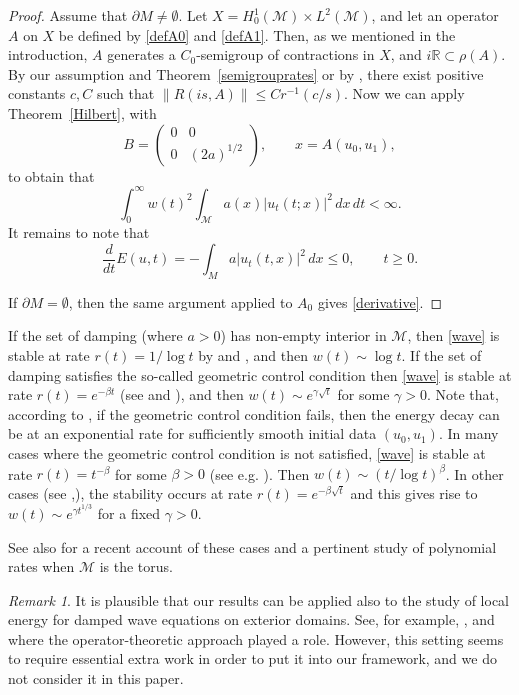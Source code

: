 \documentclass[11pt]{amsart}
\theoremstyle{definition}
\theoremstyle{remark}
\newtheorem{remark}[theorem]{Remark}
\numberwithin{equation}{section}
\begin{document}
\begin{proof}
Assume that $\partial M\neq \emptyset$. Let $X=H_0^1(\mathcal
M)\times L^2(\mathcal M)$, and let an operator $A$ on $X$ be
defined by \eqref{defA0} and \eqref{defA1}. Then, as we mentioned in
the introduction,  $A$ generates a $C_0$-semigroup of contractions
in $X$, and $i\mathbb R \subset \rho (A)$.
By our assumption and Theorem~\ref{semigrouprates} 
or by
\cite[Theorem 4.4.14]{ABHN01}, there exist positive constants
$c,C$ such that $\|R(is,A)\| \le Cr^{-1}(c/s)$. Now we can apply
Theorem~\ref{Hilbert}, with
$$
B = \begin{pmatrix} 0 & 0 \\ 0 & (2a)^{1/2} \end{pmatrix}, \qquad
x = A(u_0,u_1),
$$
to obtain that
$$ \int_{0}^{\infty} w(t)^2 \int_{\mathcal M} a(x)
|u_t(t; x)|^2 \, dx \, dt < \infty.
$$
It remains to note that
$$
\frac{d}{dt} E(u,t)=-\int_{M} a |u_t(t,x)|^2 \, dx \le 0, \qquad t \ge 0.
$$

If $\partial M=\emptyset$, then the same argument applied to
$A_0$ gives \eqref{derivative}.
\end{proof}

If the set of damping (where $a>0$) has non-empty interior in
$\mathcal M$, then \eqref{wave} is stable at rate $r(t)= 1/\log t$ by \cite{Le96} and \cite{Bu98}, and then $w(t) \sim \log t$.  If the set of
damping  satisfies the so-called geometric control condition
then \eqref{wave} is stable at rate $r(t) =  e^{-\beta t}$
(see \cite{RaTa74} and \cite{BLR92}), and then $w(t) \sim e^{\gamma \sqrt t}$ for some $\gamma >0$.  Note that, according to \cite{Sch10}, if the geometric control
condition fails, then the energy decay can be at an exponential rate for sufficiently smooth initial data $(u_0,u_1)$.  In
many cases where the geometric control condition is
not satisfied, \eqref{wave} is stable at rate $r(t) = t^{-\beta}$
for some $\beta>0$ (see e.g. \cite{AnLe12}).  Then $w(t) \sim (t/\log t)^\beta$.  In
other
cases (see \cite{Ch07},\cite{Ch10}), the stability occurs at rate
$r(t)=e^{-\beta \sqrt t}$ and this gives rise to $w(t) \sim
e^{\gamma t^{1/3}}$ for a fixed $\gamma >0$.

See also \cite{AnLe12} for a recent account of these cases and a pertinent study of
polynomial rates when
$\mathcal M$ is the torus.

\begin{remark} It is plausible that our results can be applied also to the study of local energy for damped wave equations on exterior domains. See, for example, \cite{AK02}, \cite{Kh03} and \cite{BoRo13} where the operator-theoretic approach played a role. However, this setting seems to require essential extra work in order to put it into our framework, and we do not consider it in this paper.
\end{remark}
\end{document}
